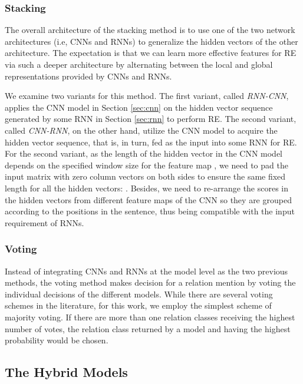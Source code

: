 \documentclass[11pt,letterpaper]{article}
\begin{document}
\subsubsection{Stacking}

The overall architecture of the stacking method is to use one of the two network architectures (i.e, CNNs and RNNs) to generalize the hidden vectors of the other architecture. The expectation is that we can learn more effective features for RE via such a deeper architecture by alternating between the local and global representations provided by CNNs and RNNs.

We examine two variants for this method. The first variant, called {\it RNN-CNN}, applies the CNN model in Section \ref{sec:cnn} on the hidden vector sequence generated by some RNN in Section \ref{sec:rnn} to perform RE. The second variant, called {\it CNN-RNN}, on the other hand, utilize the CNN model to acquire the hidden vector sequence, that is, in turn, fed as the input into some RNN for RE. For the second variant, as the length of the hidden vector   in the CNN model depends on the specified window size  for the feature map , we need to pad the input matrix  with  zero column vectors on both sides to ensure the same fixed length  for all the hidden vectors: . Besides, we need to re-arrange the scores in the hidden vectors from different feature maps of the CNN so they are grouped according to the positions in the sentence, thus being compatible with the input requirement of RNNs. 



\subsubsection{Voting}

\label{sec:voting}

Instead of integrating CNNs and RNNs at the model level as the two previous methods, the voting method makes decision for a relation mention  by voting the individual decisions of the different models. While there are several voting schemes in the literature, for this work, we employ the simplest scheme of majority voting. If there are more than one relation classes receiving the highest number of votes, the relation class returned by a model and having the highest probability would be chosen.

\subsection{The Hybrid Models}
\end{document}
